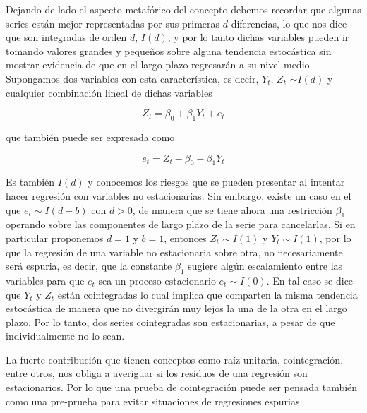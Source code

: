 Dejando de lado el aspecto metafórico del concepto debemos recordar que algunas series  están mejor representadas por sus primeras  $d$ diferencias, lo que nos dice que son integradas de orden $d$, $I(d)$, y por lo tanto dichas variables pueden ir tomando valores grandes y peque\~nos sobre alguna tendencia estocástica sin mostrar evidencia de que en el largo plazo  regresarán a su nivel medio. Supongamos dos variables con esta característica, es decir,  $Y_t$, $Z_t$ $\sim I(d)$ y cualquier combinación lineal de dichas variables

\begin{equation}\label{eq:cap3_1}
Z_t=\beta_0+\beta_1Y_t+ e_t 
\end{equation}


que también puede ser expresada como 

\begin{equation}
e_t=Z_t-\beta_0-\beta_1Y_t \label{eq:cap3_2}
\end{equation}



Es también $I(d)$ y conocemos los riesgos que se pueden presentar al intentar hacer regresión con variables no estacionarias. Sin embargo, existe  un caso en el que $e_t \sim I(d-b)$ con $d>0$, de manera que se tiene ahora una restricción $\beta_1$ operando sobre las componentes de largo plazo de la serie para cancelarlas. Si en particular proponemos $d=1$ y $b=1$, entonces $Z_t \sim I(1)$ y $Y_t \sim I(1)$, por lo que la regresión de una variable no estacionaria sobre otra, no necesariamente será espuria, es decir, que la constante $\beta_1$ sugiere algún escalamiento entre las variables para que $e_t$ sea un proceso estacionario $e_t \sim I(0)$. En tal caso se dice que $Y_t$ y $Z_t$ están cointegradas lo cual implica que comparten la misma tendencia estocástica de manera que no divergirán muy lejos la una de la otra en el largo plazo. Por lo tanto, dos series cointegradas son estacionarias, a pesar de que individualmente no lo sean.\bigskip

La fuerte contribución que tienen conceptos como raíz unitaria, cointegración, entre otros, nos obliga a averiguar si los residuos de una regresión son estacionarios. Por lo que una prueba de cointegración puede ser pensada también como una pre-prueba para evitar situaciones de regresiones espurias.\bigskip


